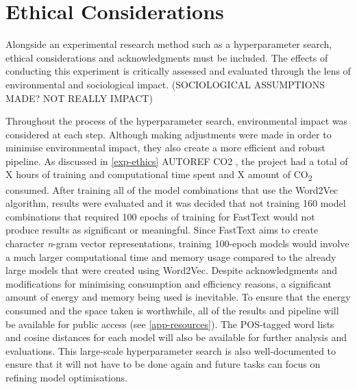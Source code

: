 \section{Ethical Considerations}

Alongside an experimental research method such as a hyperparameter search, ethical considerations and acknowledgments must be included. The effects of conducting this experiment is critically assessed and evaluated through the lens of environmental and sociological impact. (SOCIOLOGICAL ASSUMPTIONS MADE? NOT REALLY IMPACT) 

Throughout the process of the hyperparameter search, environmental impact was considered at each step. Although making adjustments were made in order to minimise environmental impact, they also create a more efficient and robust pipeline. As discussed in \autoref{exp-ethics} AUTOREF CO2 , the project had a total of X hours of training and computational time spent and X amount of CO\textsubscript{2} consumed. After training all of the model combinations that use the Word2Vec algorithm, results were evaluated and it was decided that not training 160 model combinations that required 100 epochs of training for FastText would not produce results as significant or meaningful. Since FastText aims to create character \emph{n}-gram vector representations, training 100-epoch models would involve a much larger computational time and memory usage compared to the already large models that were created using Word2Vec. Despite acknowledgments and modifications for minimising consumption and efficiency reasons, a significant amount of energy and memory being used is inevitable. To ensure that the energy consumed and the space taken is worthwhile, all of the results and pipeline will be available for public access (see \autoref{app-resources}). The POS-tagged word lists and cosine distances for each model will also be available for further analysis and evaluations. This large-scale hyperparameter search is also well-documented to ensure that it will not have to be done again and future tasks can focus on refining model optimisations. 

